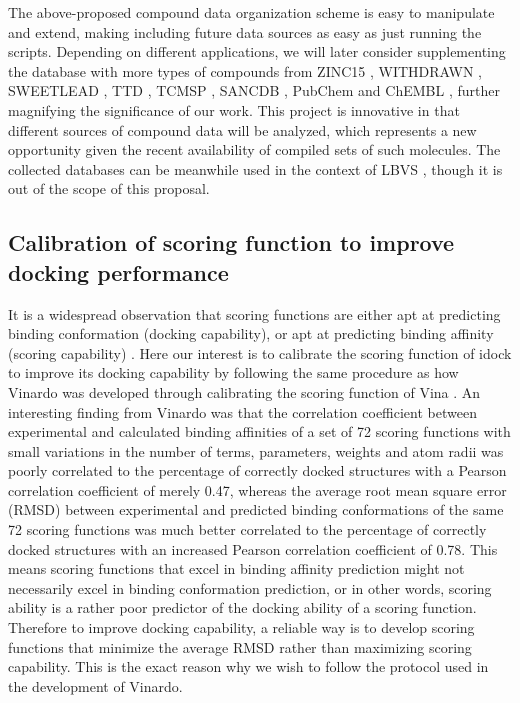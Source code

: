 \documentclass[a4paper,12pt]{article}
\begin{document}
The above-proposed compound data organization scheme is easy to manipulate and extend, making including future data sources as easy as just running the scripts. Depending on different applications, we will later consider supplementing the database with more types of compounds from ZINC15 \citep{1688}, WITHDRAWN \citep{1718}, SWEETLEAD \citep{1511}, TTD \citep{1790}, TCMSP \citep{1375}, SANCDB \citep{1680}, PubChem \citep{1701} and ChEMBL \citep{1424}, further magnifying the significance of our work. This project is innovative in that different sources of compound data will be analyzed, which represents a new opportunity given the recent availability of compiled sets of such molecules. The collected databases can be meanwhile used in the context of LBVS \citep{1749}, though it is out of the scope of this proposal.

\subsection*{Calibration of scoring function to improve docking performance}

It is a widespread observation that scoring functions are either apt at predicting binding conformation (docking capability), or apt at predicting binding affinity (scoring capability) \citep{1411,1695}. Here our interest is to calibrate the scoring function of idock \citep{1153} to improve its docking capability by following the same procedure as how Vinardo \citep{1741} was developed through calibrating the scoring function of Vina \citep{595}. An interesting finding from Vinardo was that the correlation coefficient between experimental and calculated binding affinities of a set of 72 scoring functions with small variations in the number of terms, parameters, weights and atom radii was poorly correlated to the percentage of correctly docked structures with a Pearson correlation coefficient of merely 0.47, whereas the average root mean square error (RMSD) between experimental and predicted binding conformations of the same 72 scoring functions was much better correlated to the percentage of correctly docked structures with an increased Pearson correlation coefficient of 0.78. This means scoring functions that excel in binding affinity prediction might not necessarily excel in binding conformation prediction, or in other words, scoring ability is a rather poor predictor of the docking ability of a scoring function. Therefore to improve docking capability, a reliable way is to develop scoring functions that minimize the average RMSD rather than maximizing scoring capability. This is the exact reason why we wish to follow the protocol used in the development of Vinardo.
\end{document}
